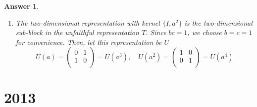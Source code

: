 \documentclass[a4paper]{article}
\newtheorem{ans}{Answer}[section]
\theoremstyle{new}
\begin{document}
\begin{ans}
\begin{enumerate}[label=(\roman*)]
\begin{enumerate}[label=(\alph*)]
We require $T(I)=T(a^4)=T(a)^4$, so $b^2c^2=1$. We either have $bc=-1$ (then $T(a)$, $T(a)^2=T(a^2)$, $T(a)^3=T(a^3)$ and $T(a)^4=T(a^4)$ are distinct matrices, hence faithful representation) or $bc=+1$ (unfaithful representation with kernel $\{I,a^2\}$ since $T(a^2)=T(a)^2=I$).
\item The two-dimensional representation with kernel $\{I,a^2\}$ is the two-dimensional sub-block in the unfaithful representation $T$. Since $bc=1$, we choose $b=c=1$ for convenience. Then, let this representation be $U$
$$U(a)=\begin{pmatrix}0&1\\1&0\\\end{pmatrix}=U(a^3),\quad U(a^2)=\begin{pmatrix}1&0\\0&1\\\end{pmatrix}=U(a^4)$$
\end{enumerate}
\end{enumerate}
\end{ans}
\newpage
\section{2013}
\end{document}
